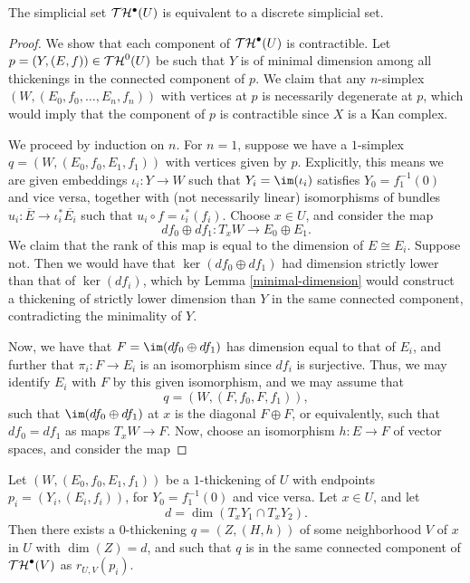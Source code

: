 \begin{prop}\label{thickenings-are-discrete}
The simplicial set $\mathcal T \mathcal H^\bullet(U)$ is equivalent to a discrete simplicial set.
\end{prop}

\begin{proof}

We show that each component of ${\mathcal T \mathcal H}^\bullet(U)$ is contractible. Let $p = (Y, (E, f)) \in {\mathcal T\mathcal H}^0(U)$ be such that $Y$ is of minimal dimension among all thickenings in the connected component of $p$. We claim that any $n$-simplex $(W, (E_0, f_0, \dots, E_n, f_n))$ with vertices at $p$ is necessarily degenerate at $p$, which would imply that the component of $p$ is contractible since $X$ is a Kan complex.

We proceed by induction on $n$. For $n = 1$, suppose we have a $1$-simplex $q = (W, (E_0, f_0, E_1, f_1))$ with vertices given by $p$. Explicitly, this means we are given embeddings $\iota_i : Y \to W$ such that $Y_i = \im(\iota_i)$ satisfies $Y_0 = f_1^{-1}(0)$ and vice versa, together with (not necessarily linear) isomorphisms of bundles $u_i: \overline{E} \to \iota_i^* \overline{E_i}$ such that $u_i \circ f = \iota_i^* (f_i)$. Choose $x \in U$, and consider the map
\[ df_0 \oplus df_1 : T_x W \to E_0 \oplus E_1. \]
We claim that the rank of this map is equal to the dimension of $E \cong E_i$. Suppose not. Then we would have that $\ker(df_0 \oplus df_1)$ had dimension strictly lower than that of $\ker(df_i)$, which by Lemma \ref{minimal-dimension} would construct a thickening of strictly lower dimension than $Y$ in the same connected component, contradicting the minimality of $Y$.

Now, we have that $F = \im(df_0 \oplus df_1)$ has dimension equal to that of $E_i$, and further that $\pi_i : F \to E_i$ is an isomorphism since $df_i$ is surjective. Thus, we may identify $E_i$ with $F$ by this given isomorphism, and we may assume that
\[ q = (W, (F, f_0, F, f_1)), \]
such that $\im(df_0 \oplus df_1)$ at $x$ is the diagonal $F \oplus F$, or equivalently, such that $df_0 = df_1$ as maps $T_x W \to F$. Now, choose an isomorphism $h: E \to F$ of vector spaces, and consider the map

\end{proof}

\begin{lemma}\label{minimal-dimension}
Let $(W, (E_0, f_0, E_1, f_1))$ be a $1$-thickening of $U$ with endpoints $p_i = (Y_i, (E_i, f_i))$, for $Y_0 = f_1^{-1}(0)$ and vice versa. Let $x \in U$, and let
\[d = \dim(T_x Y_1 \cap T_x Y_2).\]
Then there exists a $0$-thickening $q = (Z, (H, h))$ of some neighborhood $V$ of $x$ in $U$ with $\dim(Z) = d$, and such that $q$ is in the same connected component of ${\mathcal T \mathcal H}^\bullet(V)$ as $r_{U, V}(p_i)$.
\end{lemma}

